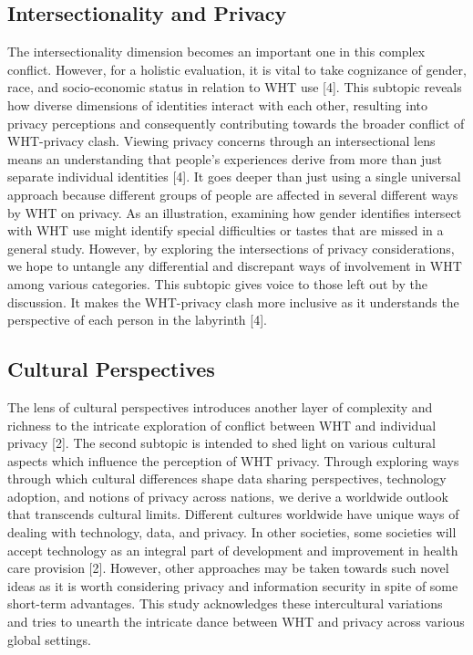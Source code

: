 \documentclass[11pt]{article}
\begin{document}
\subsection{Intersectionality and Privacy}

The intersectionality dimension becomes an important one in this complex conflict. However, for a holistic evaluation, it is vital to take cognizance of gender, race, and socio-economic status in relation to WHT use [4]. This subtopic reveals how diverse dimensions of identities interact with each other, resulting into privacy perceptions and consequently contributing towards the broader conflict of WHT-privacy clash. Viewing privacy concerns through an intersectional lens means an understanding that people’s experiences derive from more than just separate individual identities [4]. It goes deeper than just using a single universal approach because different groups of people are affected in several different ways by WHT on privacy. As an illustration, examining how gender identifies intersect with WHT use might identify special difficulties or tastes that are missed in a general study. However, by exploring the intersections of privacy considerations, we hope to untangle any differential and discrepant ways of involvement in WHT among various categories. This subtopic gives voice to those left out by the discussion. It makes the WHT-privacy clash more inclusive as it understands the perspective of each person in the labyrinth [4].

\subsection{Cultural Perspectives}

The lens of cultural perspectives introduces another layer of complexity and richness to the intricate exploration of conflict between WHT and individual privacy [2]. The second subtopic is intended to shed light on various cultural aspects which influence the perception of WHT privacy. Through exploring ways through which cultural differences shape data sharing perspectives, technology adoption, and notions of privacy across nations, we derive a worldwide outlook that transcends cultural limits. Different cultures worldwide have unique ways of dealing with technology, data, and privacy. In other societies, some societies will accept technology as an integral part of development and improvement in health care provision [2]. However, other approaches may be taken towards such novel ideas as it is worth considering privacy and information security in spite of some short-term advantages. This study acknowledges these intercultural variations and tries to unearth the intricate dance between WHT and privacy across various global settings.
\end{document}
